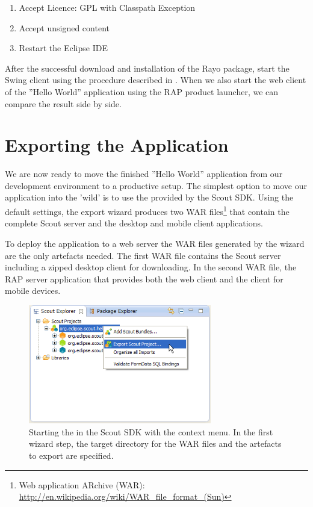 \documentclass[a4paper,10pt,twoside]{book}
\begin{document}
\begin{enumerate}
  \item Accept Licence: GPL with Classpath Exception
  \item Accept unsigned content
  \item Restart the Eclipse IDE
\end{enumerate}

After the successful download and installation of the Rayo package, start the Swing client using the procedure described in .
When we also start the web client of the ''Hello World'' application using the RAP product launcher, we can compare the result side by side.

\section{Exporting the Application}

We are now ready to move the finished ''Hello World'' application from our development environment to a productive setup.
The simplest option to move our application into the 'wild' is to use the  provided by the Scout SDK.
Using the default settings, the export wizard produces two WAR files\footnote{
Web application ARchive (WAR): \url{http://en.wikipedia.org/wiki/WAR_file_format_(Sun)}
}
that contain the complete Scout server and the desktop and mobile client applications.

To deploy the application to a web server the WAR files generated by the wizard are the only artefacts needed.
The first WAR file contains the Scout server including a zipped desktop client for downloading.
In the second WAR file, the RAP server application that provides both the web client and the client for mobile devices.

\begin{figure}
\includegraphics[width=8cm]{sdk_export_war_menu.png} 
\caption{Starting the  in the Scout SDK with the context menu. 
In the first wizard step, the target directory for the WAR files and the artefacts to export are specified.}
\end{figure}
\end{document}
